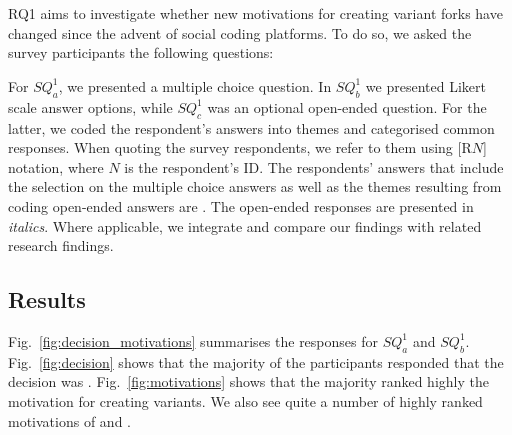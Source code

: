 \section{\RQOne}
\label{sec:results-RQ1}
RQ1 aims to investigate whether new motivations for creating variant forks have changed since the advent of social coding platforms. To do so, we asked the survey participants the following questions:

 \rqOneOne

 \rqOneTwo

\rqOneThree



For $SQ^1_{a}$, we presented a multiple choice question. In $SQ^1_{b}$ we presented Likert scale answer options, while $SQ^1_{c}$ was an optional open-ended question. For the latter, we coded the respondent's answers into themes and categorised common responses.
When quoting the survey respondents, we refer to them using [R$N$] notation, where $N$ is the respondent's ID.
The respondents' answers that include the selection on the multiple choice answers as well as the themes resulting from coding open-ended answers are .
The open-ended responses are presented in \emph{italics}.
Where applicable, we integrate and compare our findings with related research findings.

\subsection{Results}
Fig.~\ref{fig:decision_motivations} summarises the responses for $SQ^1_{a}$ and $SQ^1_{b}$. Fig.~\ref{fig:decision} shows that the majority of the participants responded that the decision was . Fig.~\ref{fig:motivations} shows that the majority ranked highly the  motivation for creating variants. We also see quite a number of highly ranked motivations of  and .

